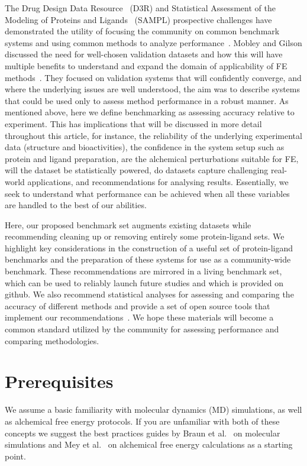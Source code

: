 \documentclass[9pt,bestpractices]{livecoms}
\begin{document}
The Drug Design Data Resource~\cite{_d3r_} (D3R) and Statistical Assessment of the Modeling of Proteins and Ligands~\cite{mobley_sampl_} (SAMPL) prospective challenges have demonstrated the utility of focusing the community on common benchmark systems and using common methods to analyze performance~\cite{geballe_sampl2_2010,muddana_blind_2012,muddana_prediction_2012,muddana_sampl4_2014,gathiaka_d3r_2016,bannan_blind_2016,yin_overview_2017,gaieb_d3r_2018,gaieb_d3r_2019,parks_d3r_2020}. Mobley and Gilson discussed the need for well-chosen validation datasets and how this will have multiple benefits to understand and expand the domain of applicability of FE methods~\cite{mobleyPredictingBindingFree2017}. They focused on validation systems that will confidently converge, and where the underlying issues are well understood, the aim was to describe systems that could be used only to assess method performance in a robust manner. As mentioned above, here we define benchmarking as assessing accuracy relative to experiment. This has implications that will be discussed in more detail throughout this article, for instance, the reliability of the underlying experimental data (structure and bioactivities), the confidence in the system setup such as protein and ligand preparation, are the alchemical perturbations suitable for FE, will the dataset be statistically powered, do datasets capture challenging real-world applications, and recommendations for analysing results. Essentially, we seek to understand what performance can be achieved when all these variables are handled to the best of our abilities.    

Here, our proposed benchmark set augments existing datasets while recommending cleaning up or removing entirely some protein-ligand sets. We highlight key considerations in the construction of a useful set of protein-ligand benchmarks and the preparation of these systems for use as a community-wide benchmark. These recommendations are mirrored in a living benchmark set, which can be used to reliably launch future studies and which is provided on github.\cite{_openforcefield_2020}
%
We also recommend statistical analyses for assessing and comparing the accuracy of different methods and provide a set of open source tools that implement our recommendations~\cite{github_openforcefield_arsenic_2020}. 
%
We hope these materials will become a common standard utilized by the community for assessing performance and comparing methodologies.  


\section{Prerequisites}
We assume a basic familiarity with molecular dynamics (MD) simulations, as well as alchemical free energy protocols. If you are unfamiliar with both of these concepts we suggest the best practices guides by Braun et al.~\cite{braunBestPracticesFoundations2019} on molecular simulations and Mey et al.~\cite{meyBestPracticesAlchemical2020} on alchemical free energy calculations as a starting point. 
\end{document}

